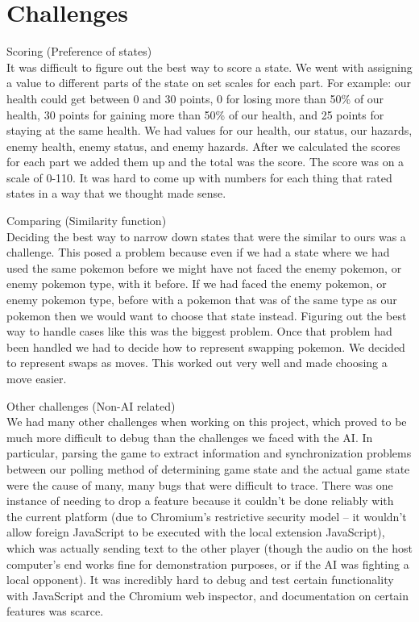 \documentclass[12pt]{article}
\begin{document}
\section{Challenges}
Scoring (Preference of states) \\
It was difficult to figure out the best way to score a state. We went with assigning a value to different parts of the state on set scales for each part. For example: 
our health could get between 0 and 30 points, 0 for losing more than 50\% of our health, 30 points for gaining more than 50\% of our health, and
25 points for staying at the same health. We had values for our health, our status, our hazards, enemy health, enemy status, and enemy hazards. After we 
calculated the scores for each part we added them up and the total was the score. The score was on a scale of 0-110. It was hard to come up with numbers 
for each thing that rated states in a way that we thought made sense. 

Comparing (Similarity function) \\
Deciding the best way to narrow down states that were the similar to ours was a challenge. This posed a problem because even if we had a state 
where we had used the same pokemon before we might have not faced the enemy pokemon, or enemy pokemon type, with it before. If we had faced the enemy pokemon,
or enemy pokemon type, before with a pokemon that was of the same type as our pokemon then we would want to choose that state instead. Figuring out the best 
way to handle cases like this was the biggest problem. Once that problem had been handled we had to decide how to represent swapping pokemon. We decided to
represent swaps as moves. This worked out very well and made choosing a move easier. 

Other challenges (Non-AI related) \\
We had many other challenges when working on this project, which proved to be much more difficult to debug than the challenges we faced with the AI.  In particular, parsing the game to extract information and synchronization problems between our polling method of determining game state and the actual game state were the cause of many, many bugs that were difficult to trace.  There was one instance of needing to drop a feature because it couldn't be done reliably with the current platform (due to Chromium's restrictive security model -- it wouldn't allow foreign JavaScript to be executed with the local extension JavaScript), which was actually sending text to the other player (though the audio on the host computer's end works fine for demonstration purposes, or if the AI was fighting a local opponent).  It was incredibly hard to debug and test certain functionality with JavaScript and the Chromium web inspector, and documentation on certain features was scarce.
\end{document}
